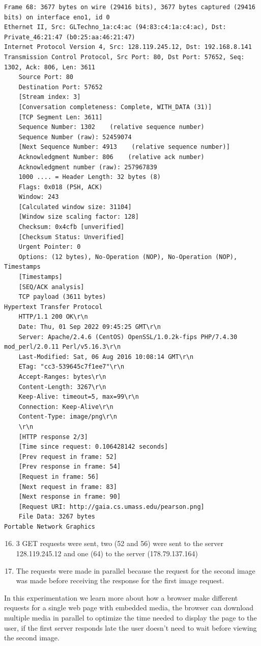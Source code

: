 \documentclass[a4paper,11pt,final]{report}
\begin{document}
\begin{lstlisting}[breaklines]
Frame 68: 3677 bytes on wire (29416 bits), 3677 bytes captured (29416 bits) on interface eno1, id 0
Ethernet II, Src: GLTechno_1a:c4:ac (94:83:c4:1a:c4:ac), Dst: Private_46:21:47 (b0:25:aa:46:21:47)
Internet Protocol Version 4, Src: 128.119.245.12, Dst: 192.168.8.141
Transmission Control Protocol, Src Port: 80, Dst Port: 57652, Seq: 1302, Ack: 806, Len: 3611
    Source Port: 80
    Destination Port: 57652
    [Stream index: 3]
    [Conversation completeness: Complete, WITH_DATA (31)]
    [TCP Segment Len: 3611]
    Sequence Number: 1302    (relative sequence number)
    Sequence Number (raw): 52459074
    [Next Sequence Number: 4913    (relative sequence number)]
    Acknowledgment Number: 806    (relative ack number)
    Acknowledgment number (raw): 257967839
    1000 .... = Header Length: 32 bytes (8)
    Flags: 0x018 (PSH, ACK)
    Window: 243
    [Calculated window size: 31104]
    [Window size scaling factor: 128]
    Checksum: 0x4cfb [unverified]
    [Checksum Status: Unverified]
    Urgent Pointer: 0
    Options: (12 bytes), No-Operation (NOP), No-Operation (NOP), Timestamps
    [Timestamps]
    [SEQ/ACK analysis]
    TCP payload (3611 bytes)
Hypertext Transfer Protocol
    HTTP/1.1 200 OK\r\n
    Date: Thu, 01 Sep 2022 09:45:25 GMT\r\n
    Server: Apache/2.4.6 (CentOS) OpenSSL/1.0.2k-fips PHP/7.4.30 mod_perl/2.0.11 Perl/v5.16.3\r\n
    Last-Modified: Sat, 06 Aug 2016 10:08:14 GMT\r\n
    ETag: "cc3-539645c7f1ee7"\r\n
    Accept-Ranges: bytes\r\n
    Content-Length: 3267\r\n
    Keep-Alive: timeout=5, max=99\r\n
    Connection: Keep-Alive\r\n
    Content-Type: image/png\r\n
    \r\n
    [HTTP response 2/3]
    [Time since request: 0.106428142 seconds]
    [Prev request in frame: 52]
    [Prev response in frame: 54]
    [Request in frame: 56]
    [Next request in frame: 83]
    [Next response in frame: 90]
    [Request URI: http://gaia.cs.umass.edu/pearson.png]
    File Data: 3267 bytes
Portable Network Graphics
\end{lstlisting}

\begin{enumerate}
\setcounter{enumi}{15}
\item 3 GET requests were sent, two (52 and 56) were sent to the server 128.119.245.12 and one (64) to the server (178.79.137.164)
\item The requests were made in parallel because the request for the second image was made before receiving the response for the first image request.
\end{enumerate}

In this experimentation we learn more about how a browser make different requests for a single web page with embedded media, the browser can download multiple media in parallel to optimize the time needed to display the page to the user, if the first server responds late the user doesn't need to wait before viewing the second image.
\end{document}
